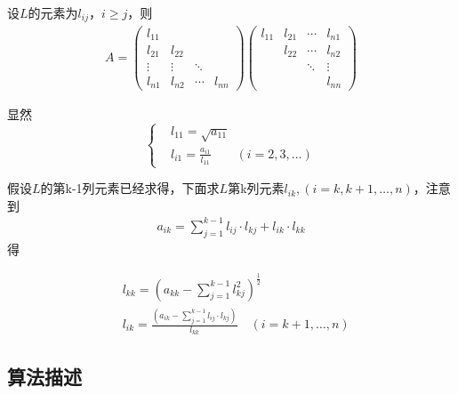 \documentclass[12pt, a4paper, oneside]{ctexart}
\begin{document}
	设$L$的元素为$l_{ij}$，$i \geq j$，则
\begin{equation}
	\begin{aligned}
		A = \left(\begin{array}{cccc}
			l_{11} & & & \\
			l_{21} & l_{22} & & \\
			\vdots & \vdots & \ddots & \\
			l_{n1} & l_{n2} & \cdots & l_{nn}
		\end{array}\right)
		\left(\begin{array}{cccc}
			l_{11} & l_{21} & \cdots & l_{n1} \\
			& l_{22} & \cdots & l_{n2} \\
			& & \ddots & \vdots \\
			& & & l_{nn}
		\end{array}\right)
	\end{aligned}
\end{equation}

显然
\begin{equation}
	\left\{
	\begin{aligned}
		& l_{11} = \sqrt{a_{11}} \\
		& l_{i1} = \frac{a_{i1}}{l_{11}} \quad \quad (i = 2, 3,  \ldots )
	\end{aligned}
	\right.
	\tag{2.4}
\end{equation}

假设$L$的第k-1列元素已经求得，下面求$L$第k列元素$l_{ik},(i = k, k+1,  \ldots ,n )$，注意到
	\begin{align}
	a_{ik} = \sum_{j=1}^{k-1} l_{ij} \cdot l_{kj} + l_{ik} \cdot l_{kk}
	\tag{2.5}
\end{align}
	得

\begin{align}
	& l_{kk} = \left( a_{kk}-\sum_{j=1}^{k-1} l_{kj}^2 \right)^{\frac{1}{2}}
	\tag{2.6} \\
	& l_{ik} = \frac{( a_{ik}-\sum_{j=1}^{k-1} l_{ij} \cdot l_{kj} )} {l_{kk}}  \quad (i = k+1, \ldots, n)
	\tag{2.7}
\end{align}

	\subsection{算法描述}
\end{document}
